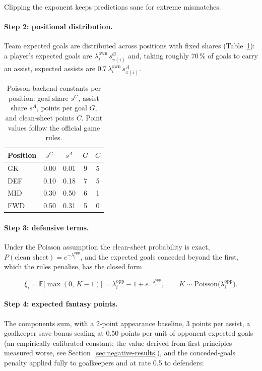 Clipping the exponent keeps predictions sane for extreme mismatches.

\paragraph{Step 2: positional distribution.}
Team expected goals are distributed across positions with fixed
shares (Table~\ref{tab:poisson-constants}): a player's expected goals
are $\lambda^{\mathrm{own}}_i\, s^{G}_{\pi(i)}$ and, taking roughly
70\,\% of goals to carry an assist, expected assists are $0.7\,
\lambda^{\mathrm{own}}_i\, s^{A}_{\pi(i)}$.

\begin{table}[t]
\centering
\caption{Poisson backend constants per position: goal share $s^{G}$,
assist share $s^{A}$, points per goal $G$, and clean-sheet points
$C$. Point values follow the official game rules.}
\label{tab:poisson-constants}
\begin{tabular}{lcccc}
\toprule
Position & $s^{G}$ & $s^{A}$ & $G$ & $C$ \\
\midrule
GK  & 0.00 & 0.01 & 9 & 5 \\
DEF & 0.10 & 0.18 & 7 & 5 \\
MID & 0.30 & 0.50 & 6 & 1 \\
FWD & 0.50 & 0.31 & 5 & 0 \\
\bottomrule
\end{tabular}
\end{table}

\paragraph{Step 3: defensive terms.}
Under the Poisson assumption the clean-sheet probability is exact,
$P(\text{clean sheet}) = e^{-\lambda^{\mathrm{opp}}_i}$, and the
expected goals conceded beyond the first, which the rules penalise,
has the closed form

\begin{equation}
\xi_i = \mathbb{E}\bigl[\max(0,\, K - 1)\bigr]
      = \lambda^{\mathrm{opp}}_i - 1 + e^{-\lambda^{\mathrm{opp}}_i},
\qquad K \sim \mathrm{Poisson}\bigl(\lambda^{\mathrm{opp}}_i\bigr).
\label{eq:poisson-xi}
\end{equation}

\paragraph{Step 4: expected fantasy points.}
The components sum, with a 2-point appearance baseline, 3 points per
assist, a goalkeeper save bonus scaling at 0.50 points per unit of
opponent expected goals (an empirically calibrated constant; the
value derived from first principles measured worse, see
Section~\ref{sec:negative-results}), and the conceded-goals penalty
applied fully to goalkeepers and at rate 0.5 to defenders:

